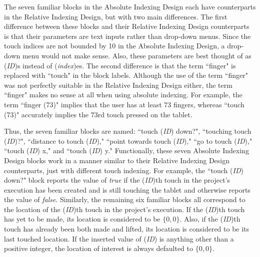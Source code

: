 The seven familiar blocks in the Absolute Indexing Design each have counterparts in the Relative Indexing Design, but with two main differences. The first difference between these blocks and their Relative Indexing Design counterparts is that their parameters are text inputs rather than drop-down menus. Since the touch indices are not bounded by 10 in the Absolute Indexing Design, a drop-down menu would not make sense. Also, these parameters are best thought of as (\emph{ID})s instead of (\emph{index})es. The second difference is that the term ``finger" is replaced with ``touch" in the block labels. Although the use of the term ``finger" was not perfectly suitable in the Relative Indexing Design either, the term ``finger"  makes no sense at all when using absolute indexing. For example, the term ``finger (73)" implies that the user has at least 73 fingers, whereas ``touch (73)" accurately implies the 73rd touch pressed on the tablet.

Thus, the seven familiar blocks are named: ``touch (\emph{ID}) down?", ``touching touch (\emph{ID})?", ``distance to touch (\emph{ID})," ``point towards touch (\emph{ID})," ``go to touch (\emph{ID})," ``touch (\emph{ID}) x," and ``touch (\emph{ID}) y." Functionally, these seven Absolute Indexing Design blocks work in a manner similar to their Relative Indexing Design counterparts, just with different touch indexing. For example, the ``touch (\emph{ID}) down?" block reports the value of \emph{true} if the (\emph{ID})th touch in the project's execution  has been created and is still touching the tablet and otherwise reports the value of \emph{false}. Similarly, the remaining six familiar blocks all correspond to the location of the (\emph{ID})th touch in the project's execution. If the (\emph{ID})th touch has yet to be made, its location is considered to be $\{0,0\}$. Also, if the (\emph{ID})th touch has already been both made and lifted, its location is considered to be its last touched location. If the inserted value of (\emph{ID}) is anything other than a positive integer, the location of interest is always defaulted to $\{0,0\}$.

